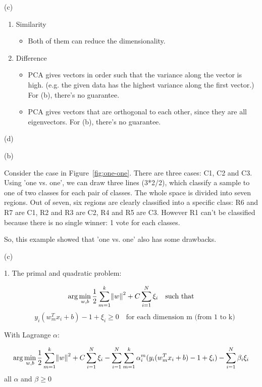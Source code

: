 \documentclass[11pt]{article}
\theoremstyle{definition}
\begin{document}
(c)
\begin{enumerate}
\item Similarity
\begin{itemize}
\item Both of them can reduce the dimensionality.
\end{itemize}

\item Difference
\begin{itemize}
\item PCA gives vectors in order such that the variance along the vector is high.
(e.g. the given data has the highest variance along the first vector.)
For (b), there's no guarantee.

\item PCA gives vectors that are orthogonal to each other, since they are all eigenvectors.
For (b), there's no guarantee.

\end{itemize}
\end{enumerate}

(d)

\pagebreak

(b)

Consider the case in Figure~\ref{fig:one-one}. There are three cases: C1, C2 and C3. Using
'one vs. one', we can draw three lines (3*2/2), which classify a sample to one
of two classes for each pair of classes.  The whole space is divided into seven
regions.  Out of seven, six regions are clearly classified into a specific
class: R6 and R7 are C1, R2 and R3 are C2, R4 and R5 are C3.  However R1 can't
be classified because there is no single winner: 1 vote for each classes.

So, this example showed that 'one vs. one' also has some drawbacks.

\pagebreak

(c)

1. The primal and quadratic problem:

\begin{equation*}
\arg \min_{w,b} \frac{1}{2} \sum_{m=1}^{k} \norm{w}^2 + C \sum_{i=1}^{N}\xi_i \quad \text{such that}
\end{equation*}
\begin{equation*}
\quad y_i (w_m^T x_i + b) -1 + \xi_i \ge 0 \quad \text{for each dimension m (from 1 to k)}
\end{equation*}

With Lagrange $\alpha$:

\begin{equation*}
\arg \min_{w,b} \frac{1}{2} \sum_{m=1}^{k} \norm{w}^2 + C \sum_{i=1}^{N}\xi_i
- \sum_{i=1}^{N}\sum_{m=1}^{k}\alpha_{i}^{m}(y_i(w_m^T x_i + b) -1 + \xi_i)
- \sum_{i=1}^{N}\beta_i\xi_i
\end{equation*}
all $\alpha$ and $\beta \ge 0$
\end{document}
